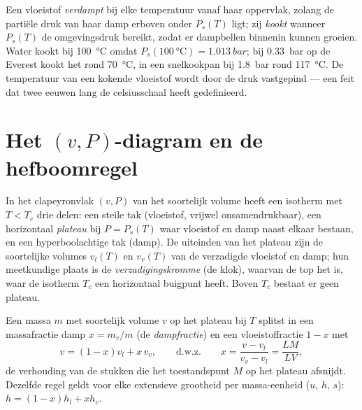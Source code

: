 \begin{remark}\label{rem:b1:phase-changes:boiling}
Een vloeistof \emph{verdampt} bij elke temperatuur vanaf haar oppervlak, zolang
de partiële druk van haar damp erboven onder $P_s(T)$ ligt; zij
\emph{kookt} wanneer $P_s(T)$ de omgevingsdruk bereikt, zodat er
dampbellen binnenin kunnen groeien. Water kookt bij \qty{100}{\degreeCelsius}
omdat $P_s(\qty{100}{\degreeCelsius}) = \qty{1.013}{bar}$; bij
\qty{0.33}{bar} op de Everest kookt het rond \qty{70}{\degreeCelsius}, in een
snelkookpan bij \qty{1.8}{bar} rond \qty{117}{\degreeCelsius}. De
temperatuur van een kokende vloeistof wordt door de druk vastgepind --- een feit
dat twee eeuwen lang de celsiusschaal heeft gedefinieerd.
\end{remark}

\section{Het $(v, P)$-diagram en de hefboomregel}

\begin{proposition}\label{prop:b1:phase-changes:andrews}
In het clapeyronvlak $(v, P)$ van het soortelijk volume heeft een isotherm
met $T < T_c$ drie delen: een steile tak (vloeistof, vrijwel
onsamendrukbaar), een horizontaal \emph{plateau} bij $P = P_s(T)$ waar vloeistof
en damp naast elkaar bestaan, en een hyperboolachtige tak (damp). De uiteinden van het
plateau zijn de soortelijke volumes $v_l(T)$ en $v_v(T)$ van de verzadigde
vloeistof en damp; hun meetkundige plaats is de \emph{verzadigingskromme} (de
klok), waarvan de top het  is, waar de isotherm $T_c$
een horizontaal buigpunt heeft. Boven $T_c$ bestaat er geen plateau.
\end{proposition}
\admitted

\begin{theorem}[Hefboomregel]\label{thm:b1:phase-changes:lever}
Een massa $m$ met soortelijk volume $v$ op het plateau bij $T$ splitst in een
massafractie damp $x = m_v/m$ (de \emph{dampfractie}) en een vloeistoffractie
$1 - x$ met
\[
v = (1 - x)v_l + x\,v_v , \qquad\text{d.w.z.}\qquad
x = \frac{v - v_l}{v_v - v_l} = \frac{LM}{LV} ,
\]
de verhouding van de stukken die het toestandspunt $M$ op het plateau afsnijdt.
Dezelfde regel geldt voor elke extensieve grootheid per massa-eenheid ($u$,
$h$, $s$): $h = (1 - x)h_l + xh_v$.
\end{theorem}

